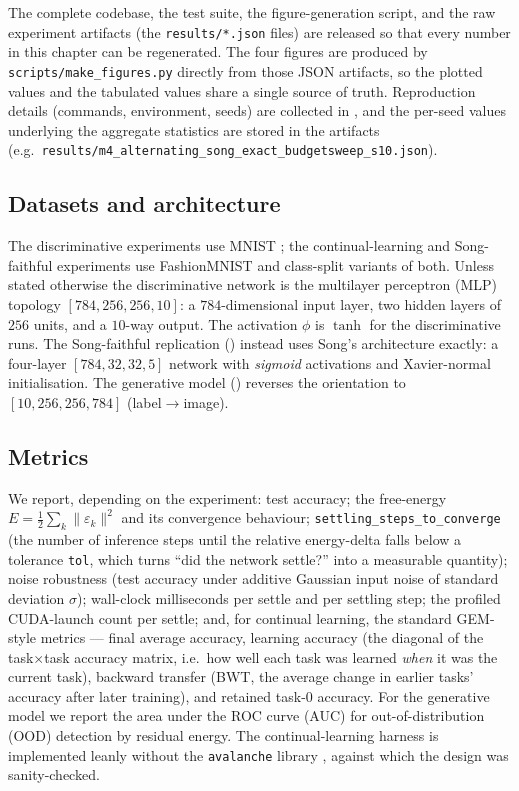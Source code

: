 The complete codebase, the test suite, the figure-generation script, and the raw experiment
artifacts (the \texttt{results/*.json} files) are released so that every number in this chapter
can be regenerated. The four figures are produced by \texttt{scripts/make\_figures.py} directly
from those JSON artifacts, so the plotted values and the tabulated values share a single source of
truth. Reproduction details (commands, environment, seeds) are collected in , and
the per-seed values underlying the aggregate statistics are stored in the artifacts (e.g.\
\texttt{results/m4\_alternating\_song\_exact\_budgetsweep\_s10.json}).

\subsection{Datasets and architecture}

The discriminative experiments use MNIST \citep{lecun1998mnist}; the continual-learning and
Song-faithful experiments use FashionMNIST \citep{xiao2017fashionmnist} and class-split variants
of both. Unless stated otherwise the discriminative network is the multilayer perceptron (MLP)
topology \([784,256,256,10]\): a \(784\)-dimensional input layer, two hidden layers of \(256\)
units, and a \(10\)-way output. The activation \(\phi\) is \(\tanh\) for the discriminative runs.
The Song-faithful replication (\Cref{sec:exp-song}) instead uses Song's architecture exactly: a
four-layer \([784,32,32,5]\) network with \emph{sigmoid} activations and Xavier-normal
initialisation. The generative model (\Cref{sec:exp-gen}) reverses the orientation to
\([10,256,256,784]\) (label\(\rightarrow\)image).

\subsection{Metrics}

We report, depending on the experiment: test accuracy; the free-energy
\(E=\tfrac12\sum_k\lVert\varepsilon_k\rVert^2\) and its convergence behaviour;
\texttt{settling\_steps\_to\_converge} (the number of inference steps until the relative
energy-delta falls below a tolerance \texttt{tol}, which turns ``did the network settle?'' into a
measurable quantity); noise robustness (test accuracy under additive Gaussian input noise of
standard deviation \(\sigma\)); wall-clock milliseconds per settle and per settling step; the
profiled CUDA-launch count per settle; and, for continual learning, the standard GEM-style
metrics \citep{lopezpaz2017gem} --- final average accuracy, learning accuracy (the diagonal of the
task\(\times\)task accuracy matrix, i.e.\ how well each task was learned \emph{when} it was the
current task), backward transfer (BWT, the average change in earlier tasks' accuracy after later
training), and retained task-0 accuracy. For the generative model we report the area under the ROC
curve (AUC) for out-of-distribution (OOD) detection by residual energy. The continual-learning
harness is implemented leanly without the \texttt{avalanche} library
\citep{lomonaco2021avalanche}, against which the design was sanity-checked.

